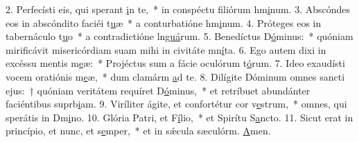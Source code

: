 2. Perfecísti eis, qui sperant \uline{i}n te,~* in conspéctu filiórum hm\uline{i}num.
3. Abscóndes eos in abscóndito faciéi t\uline{u}æ~* a conturbatióne hm\uline{i}num.
4. Próteges eos in tabernáculo t\uline{u}o~* a contradictióne ln\uline{guá}rum.
5. Benedíctus D\uline{ó}minus:~* quóniam mirificávit misericórdiam suam mihi in civitáte mn\uline{í}ta.
6. Ego autem dixi in excéssu mentis m\uline{e}æ:~* Projéctus sum a fácie oculórum t\uline{ó}rum.
7. Ideo exaudísti vocem oratiónis m\uline{e}æ,~* dum clamárm \uline{a}d te.
8. Dilígite Dóminum omnes sancti ejus:~† quóniam veritátem requíret D\uline{ó}minus,~* et retríbuet abundánter faciéntibus suprb\uline{i}am.
9. Viríliter ágite, et confortétur cor v\uline{e}strum,~* omnes, qui sperátis in Dm\uline{i}no.
10. Glória Patri, et F\uline{í}lio,~* et Spirítu S\uline{a}ncto.
11. Sicut erat in princípio, et nunc, et s\uline{e}mper,~* et in sǽcula sæculórm. \uline{A}men.
